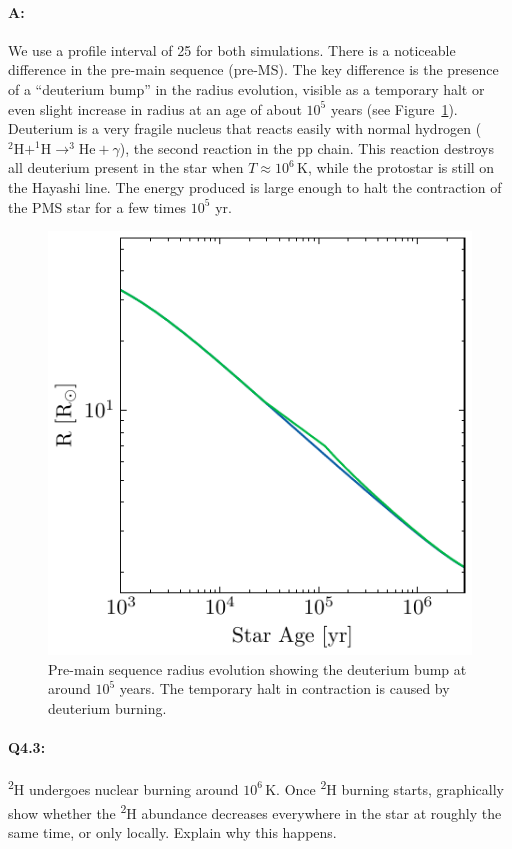 \documentclass[twocolumn,fontsize=11pt]{scrartcl}
\begin{document}
\paragraph{A:} We use a profile interval of 25 for both simulations. There is a noticeable difference in the pre-main sequence (pre-MS). The key difference is the presence of a \enquote{deuterium bump} in the radius evolution, visible as a temporary halt or even slight increase in radius at an age of about \(10^5\) years (see Figure~\ref{fig:q42_radius_vs_age}). Deuterium is a very fragile nucleus that reacts easily with normal hydrogen (\(^{2}\mathrm{H} + ^{1}\mathrm{H} \rightarrow ^{3}\mathrm{He} + \gamma\)), the second reaction in the pp chain. This reaction destroys all deuterium present in the star when \(T \approx 10^6\,\mathrm{K}\), while the protostar is still on the Hayashi line. The energy produced is large enough to halt the contraction of the PMS star for a few times \(10^5\) yr.
\begin{figure}[htbp]
    \centering
    \includegraphics{q42_radius_vs_age.pdf}
    \caption{Pre-main sequence radius evolution showing the deuterium bump at around \(10^5\) years. The temporary halt in contraction is caused by deuterium burning.}
    \label{fig:q42_radius_vs_age}
\end{figure}

\paragraph{Q4.3:} \textsuperscript{2}H undergoes nuclear burning around \(10^6\,\mathrm{K}\). Once \textsuperscript{2}H burning starts, graphically show whether the \textsuperscript{2}H abundance decreases everywhere in the star at roughly the same time, or only locally. Explain why this happens.
\end{document}
